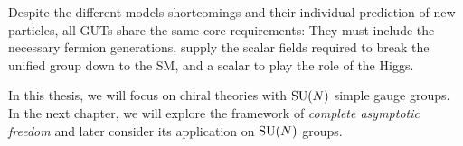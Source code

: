 Despite the different models shortcomings and their individual prediction of new particles, all GUTs share the same core requirements: They must include the necessary fermion generations, supply the scalar fields required to break the unified group down to the SM, and a scalar to play the role of the Higgs.

In this thesis, we will focus on chiral theories with $\mathrm{SU}(N)$ simple gauge groups. In the next chapter, we will explore the framework of \textit{complete asymptotic freedom} and later consider its application on $\mathrm{SU}(N)$ groups.  
